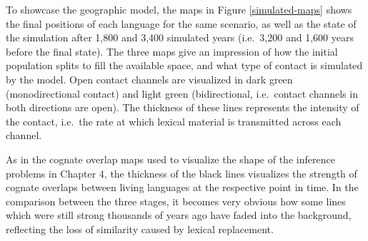To showcase the geographic model, the maps in Figure \ref{simulated-maps} shows the final positions of each language for the same scenario, as well as the state of the simulation after 1,800 and 3,400 simulated years (i.e.\ 3,200 and 1,600 years before the final state). The three maps give an impression of how the initial population splits to fill the available space, and what type of contact is simulated by the model. Open contact channels are visualized in dark green (monodirectional contact) and light green (bidirectional, i.e.\ contact channels in both directions are open). The thickness of these lines represents the intensity of the contact, i.e.\ the rate at which lexical material is transmitted across each channel.

As in the cognate overlap maps used to visualize the shape of the inference problems in Chapter 4, the thickness of the black lines visualizes the strength of cognate overlaps between living languages at the respective point in time. In the comparison between the three stages, it becomes very obvious how some lines which were still strong thousands of years ago have faded into the background, reflecting the loss of similarity caused by lexical replacement.

